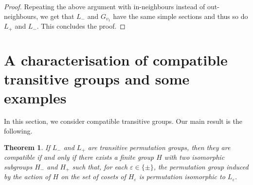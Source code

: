 \documentclass[twoside,12pt,leqno]{amsproc}
\numberwithin{table}{section}
\numberwithin{figure}{section}
\theoremstyle{plain}
\newtheorem{theorem}{Theorem}[section]
\theoremstyle{definition}\newtheorem{definition}[theorem]{Definition}
\theoremstyle{definition}\newtheorem{example}[theorem]{Example}
\theoremstyle{definition}\newtheorem{construction}[theorem]{Construction}
\theoremstyle{definition}\newtheorem{remark}[theorem]{Remark}
\theoremstyle{definition}\newtheorem{problem}[theorem]{Problem}
\begin{document}
\begin{proof}
Repeating the above argument with in-neighbours instead of out-neighbours, we get that $L_-$ and $G_{v_1}$ have the same simple sections and thus so do $L_+$ and $L_-$.  This concludes the proof.
\end{proof}

\section{A characterisation of compatible transitive groups and some examples}\label{S:HNN}

In this section, we consider compatible transitive groups. Our main result is the following. 

\begin{theorem}\label{theo:ProduceExamples}
If $L_-$ and $L_+$ are transitive permutation groups, then they are compatible if and only if there exists a finite group $H$ with two isomorphic subgroups $H_-$ and $H_+$ such that, for each ${\varepsilon}\in\{\pm\}$, the permutation group induced by the action of $H$ on the set of cosets of $H_{\varepsilon}$ is permutation isomorphic to $L_{\varepsilon}$.
\end{theorem}
\end{document}
